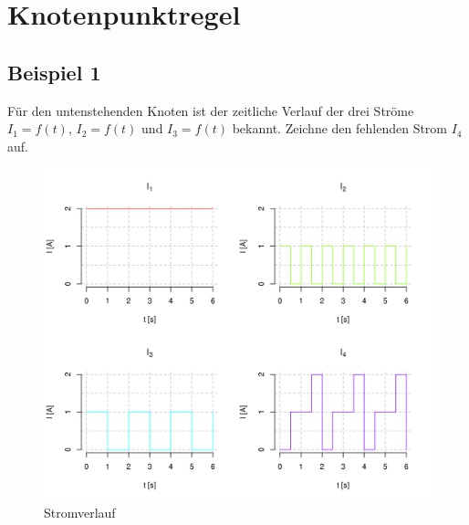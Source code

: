 \section{Knotenpunktregel}\label{knotenpunktregel}

\subsection{Beispiel 1}\label{beispiel-1}

Für den untenstehenden Knoten ist der zeitliche Verlauf der drei Ströme
\(I_1 = f(t)\), \(I_2 = f(t)\) und \(I_3 = f(t)\) bekannt. Zeichne den
fehlenden Strom \(I_4\) auf.\\


\begin{figure}[htbp]
\centering
\includegraphics{img/kirchhoff_1-1.png}
\caption{Stromverlauf}
\end{figure}
